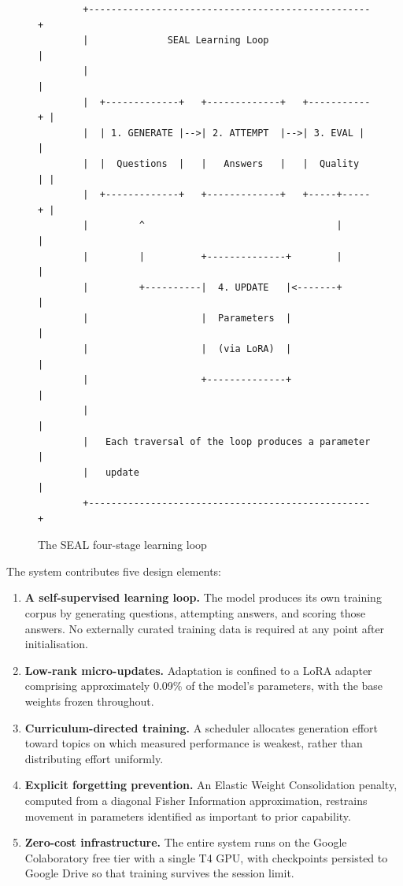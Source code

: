 \documentclass[12pt,a4paper]{report}
\begin{document}
\begin{figure}[htbp]
\centering
\begin{verbatim}
        +--------------------------------------------------+
        |              SEAL Learning Loop                   |
        |                                                   |
        |  +-------------+   +-------------+   +-----------+ |
        |  | 1. GENERATE |-->| 2. ATTEMPT  |-->| 3. EVAL | |
        |  |  Questions  |   |   Answers   |   |  Quality  | |
        |  +-------------+   +-------------+   +-----+-----+ |
        |         ^                                  |      |
        |         |          +--------------+        |      |
        |         +----------|  4. UPDATE   |<-------+      |
        |                    |  Parameters  |               |
        |                    |  (via LoRA)  |               |
        |                    +--------------+               |
        |                                                   |
        |   Each traversal of the loop produces a parameter |
        |   update                                          |
        +--------------------------------------------------+
\end{verbatim}
\caption{The SEAL four-stage learning loop}
\end{figure}

The system contributes five design elements:

\begin{enumerate}[leftmargin=*]
    \item \textbf{A self-supervised learning loop.} The model produces its own training corpus by generating questions, attempting answers, and scoring those answers. No externally curated training data is required at any point after initialisation.
    \item \textbf{Low-rank micro-updates.} Adaptation is confined to a LoRA adapter comprising approximately 0.09\% of the model's parameters, with the base weights frozen throughout.
    \item \textbf{Curriculum-directed training.} A scheduler allocates generation effort toward topics on which measured performance is weakest, rather than distributing effort uniformly.
    \item \textbf{Explicit forgetting prevention.} An Elastic Weight Consolidation penalty, computed from a diagonal Fisher Information approximation, restrains movement in parameters identified as important to prior capability.
    \item \textbf{Zero-cost infrastructure.} The entire system runs on the Google Colaboratory free tier with a single T4 GPU, with checkpoints persisted to Google Drive so that training survives the session limit.
\end{enumerate}
\end{document}
